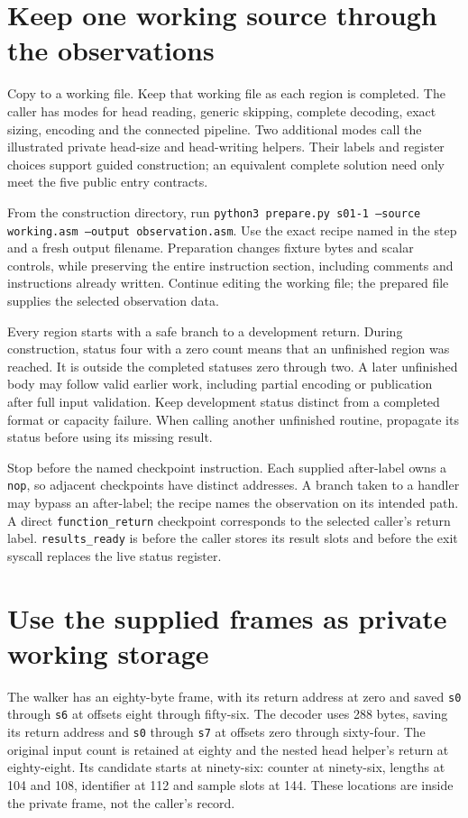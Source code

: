 \section{Keep one working source through the observations}
Copy  to a working file. Keep that working
file as each region is completed. The caller has modes for head reading, generic
skipping, complete decoding, exact sizing, encoding and the connected pipeline. Two
additional modes call the illustrated private head-size and head-writing helpers.
Their labels and register choices support guided construction; an equivalent complete
solution need only meet the five public entry contracts.

From the construction directory, run
\texttt{python3 prepare.py s01-1 --source working.asm --output observation.asm}.
Use the exact recipe named in the step and a fresh output filename. Preparation
changes fixture bytes and scalar controls, while preserving the entire instruction
section, including comments and instructions already written. Continue editing the
working file; the prepared file supplies the selected observation data.

Every region starts with a safe branch to a development return. During construction,
status four with a zero count means that an unfinished region was reached. It is
outside the completed statuses zero through two. A later unfinished body may follow
valid earlier work, including partial encoding or publication after full input
validation. Keep development status distinct from a completed format or capacity
failure. When calling another unfinished routine, propagate its status before using
its missing result.

Stop before the named checkpoint instruction. Each supplied after-label owns a
\texttt{nop}, so adjacent checkpoints have distinct addresses. A branch taken to a
handler may bypass an after-label; the recipe names the observation on its intended
path. A direct \texttt{function\_return} checkpoint corresponds to the selected
caller's return label. \texttt{results\_ready} is before the caller stores its result
slots and before the exit syscall replaces the live status register.

\section{Use the supplied frames as private working storage}
The walker has an eighty-byte frame, with its return address at zero and saved
\texttt{s0} through \texttt{s6} at offsets eight through fifty-six. The decoder uses
288 bytes, saving its return address and \texttt{s0} through \texttt{s7} at offsets
zero through sixty-four. The original input count is retained at eighty and the nested
head helper's return at eighty-eight. Its candidate starts at ninety-six: counter at
ninety-six, lengths at 104 and 108, identifier at 112 and sample slots at 144. These
locations are inside the private frame, not the caller's record.

